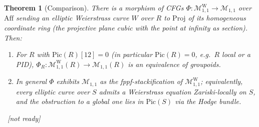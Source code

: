 \documentclass[11pt]{article}
\newcommand{\lean}[1]{\par\smallskip\noindent{\footnotesize\texttt{Lean:\ #1}}\par}
\newcommand{\uses}[1]{}
\newcommand{\notready}{{\footnotesize\textcolor{red!60!black}{\ [not ready]}}}
\theoremstyle{definition}
\theoremstyle{plain}
\newtheorem{theorem}[definition]{Theorem}
\theoremstyle{remark}
\newcommand{\Aff}{\mathrm{Aff}}
\newcommand{\MW}{\mathcal{M}^{\mathrm{W}}_{1,1}}
\newcommand{\Mss}{\mathcal{M}_{1,1}}
\begin{document}
\begin{theorem}[Comparison]\label{thm:comparison}
There is a morphism of CFGs $\Phi:\MW\to\Mss$ over $\Aff$ sending an elliptic
Weierstrass curve $W$ over $R$ to $\mathrm{Proj}$ of its homogeneous coordinate
ring (the projective plane cubic with the point at infinity as section).  Then:
\begin{enumerate}[label=(\alph*)]
\item For $R$ with $\mathrm{Pic}(R)[12]=0$ (in particular $\mathrm{Pic}(R)=0$,
e.g.\ $R$ local or a PID), $\Phi_R:\MW(R)\to\Mss(R)$ is an equivalence of
groupoids.
\item In general $\Phi$ exhibits $\Mss$ as the fppf-stackification of $\MW$;
equivalently, every elliptic curve over $S$ admits a Weierstrass equation
Zariski-locally on $S$, and the obstruction to a global one lies in
$\mathrm{Pic}(S)$ via the Hodge bundle.
\end{enumerate}
\lean{}\notready
\uses{def:MW,def:geomell,thm:quotient,rem:stackification,warn:pic}
\end{theorem}
\end{document}
